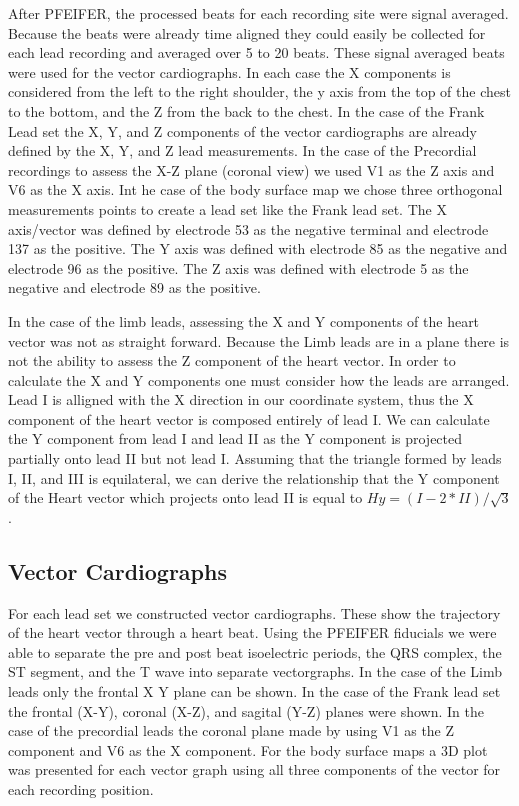 \documentclass[12pt]{article}
\begin{document}
\par{}
After PFEIFER, the processed beats for each recording site were signal averaged. Because the beats were already time aligned they could easily be collected for each lead recording and averaged over 5 to 20 beats. These signal averaged beats were used for the vector cardiographs. In each case the X components is considered from the left to the right shoulder, the y axis from the top of the chest to the bottom, and the Z from the back to the chest.
In the case of the Frank Lead set the X, Y, and Z components of the vector cardiographs are already defined by the X, Y, and Z lead measurements. In the case of the Precordial recordings to assess the X-Z plane (coronal view) we used V1 as the Z axis and V6 as the X axis. Int he case of the body surface map we chose three orthogonal measurements points to create a lead set like the Frank lead set. The X axis/vector was defined by electrode 53 as the negative terminal and electrode 137 as the positive. The Y axis was defined with electrode 85 as the negative and electrode 96 as the positive. The Z axis was defined with electrode 5 as the negative and electrode 89 as the positive.
\par{}
In the case of the limb leads, assessing the X and Y components of the heart vector was not as straight forward. Because the Limb leads are in a plane there is not the ability to assess the Z component of the heart vector. In order to calculate the X and Y components one must consider how the leads are arranged. Lead I is alligned with the X direction in our coordinate system, thus the X component of the heart vector is composed entirely of lead I. We can calculate the Y component from lead I and lead II as the Y component is projected partially onto lead II but not lead I. Assuming that the triangle formed by leads I, II, and III is equilateral, we can derive the relationship that the Y component of the Heart vector which projects onto lead II is equal to $Hy = (I - 2*II)/\sqrt{3}$. 

\subsection{Vector Cardiographs}
\par{}
For each lead set we constructed vector cardiographs. These show the trajectory of the heart vector through a heart beat. Using the PFEIFER fiducials we were able to separate the pre and post beat isoelectric periods, the QRS complex, the ST segment, and the T wave into separate vectorgraphs. In the case of the Limb leads only the frontal X Y plane can be shown. In the case of the Frank lead set the frontal (X-Y), coronal (X-Z), and sagital (Y-Z) planes were shown. In the case of the precordial leads the coronal plane made by using V1 as the Z component and V6 as the X component. For the body surface maps a 3D plot was presented for each vector graph using all three components of the vector for each recording position.
\end{document}
